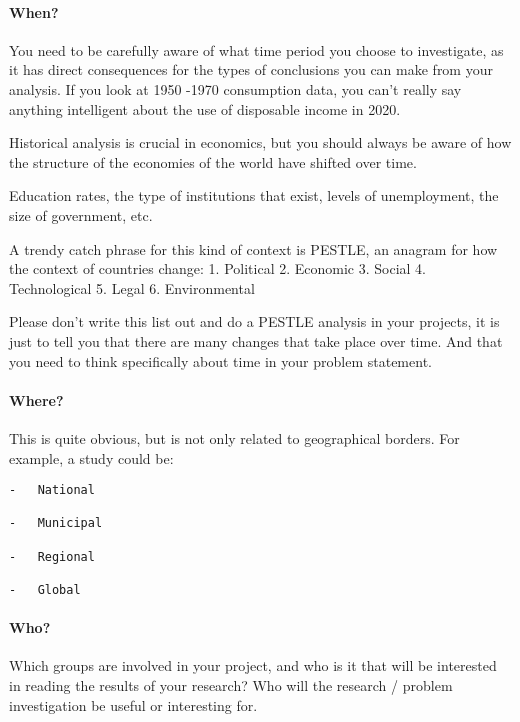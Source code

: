 \documentclass[10pt,twoside]{article}
\let\oldparagraph\paragraph
\renewcommand{\paragraph}[1]{\oldparagraph{#1}\mbox{}}
\begin{document}
\hypertarget{when}{%
\paragraph{When?}\label{when}}

You need to be carefully aware of what time period you choose to
investigate, as it has direct consequences for the types of conclusions
you can make from your analysis. If you look at 1950 -1970 consumption
data, you can't really say anything intelligent about the use of
disposable income in 2020.

Historical analysis is crucial in economics, but you should always be
aware of how the structure of the economies of the world have shifted
over time.

Education rates, the type of institutions that exist, levels of
unemployment, the size of government, etc.

A trendy catch phrase for this kind of context is PESTLE, an anagram for
how the context of countries change: 1. Political 2. Economic 3. Social
4. Technological 5. Legal 6. Environmental

Please don't write this list out and do a PESTLE analysis in your
projects, it is just to tell you that there are many changes that take
place over time. And that you need to think specifically about time in
your problem statement.

\hypertarget{where}{%
\paragraph{Where?}\label{where}}

This is quite obvious, but is not only related to geographical borders.
For example, a study could be:

\begin{verbatim}
-   National

-   Municipal

-   Regional

-   Global
\end{verbatim}

\hypertarget{who}{%
\paragraph{Who?}\label{who}}

Which groups are involved in your project, and who is it that will be
interested in reading the results of your research? Who will the
research / problem investigation be useful or interesting for.
\end{document}
